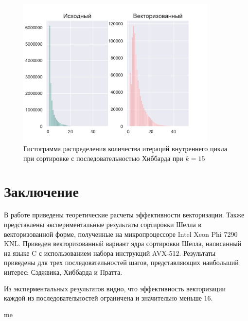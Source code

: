 \documentclass[utf8]{psta}
\begin{document}
\begin{figure}
\includegraphics[width=10cm]{pics/pic_hibbard_k_15}
\caption{Гистограмма распределения количества итераций внутреннего цикла при сортировке с последовательностью Хиббарда при $k = 15$}
\label{pic:hibbard_k_15}
\end{figure}



\section*{Заключение}

В работе приведены теоретические расчеты эффективности векторизации. 
Также представлены экспериментальные результаты сортировки Шелла в векторизованной форме, полученные на микропроцессоре Intel Xeon Phi 7290 KNL.
Приведен векторизованный вариант ядра сортировки Шелла, написанный на языке C с использованием набора инструкций AVX-512. 
Результаты приведены для трех последовательностей шагов, представляющих наибольший интерес: Сэджвика, Хиббарда и Пратта. 

Из эксперментальных результатов видно, что эффективность векторизации каждой из последовательностей ограничена и значительно меньше 16.

\begin{thebibliography}{30}

\by me

\end{thebibliography}
\end{document}
